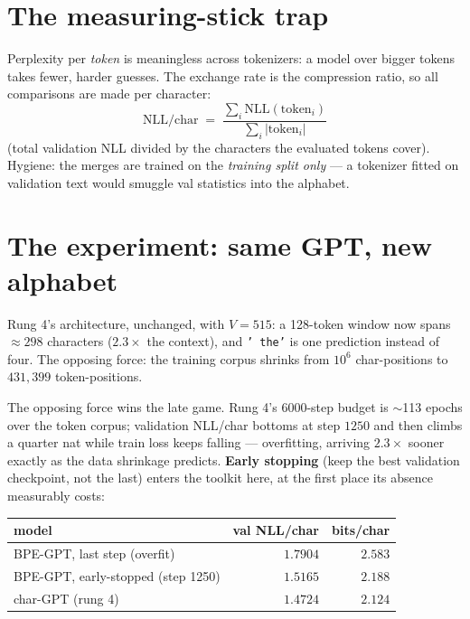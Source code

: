 \documentclass[11pt]{article}
\begin{document}
\section{The measuring-stick trap}

Perplexity per \emph{token} is meaningless across tokenizers: a model
over bigger tokens takes fewer, harder guesses. The exchange rate is
the compression ratio, so all comparisons are made per character:
\begin{equation}
  \boxed{\;\mathrm{NLL/char}
  \;=\; \frac{\sum_i \mathrm{NLL}(\mathrm{token}_i)}
             {\sum_i |\mathrm{token}_i|}\;}
  \label{eq:perchar}
\end{equation}
(total validation NLL divided by the characters the evaluated tokens
cover). Hygiene: the merges are trained on the \emph{training split
only} --- a tokenizer fitted on validation text would smuggle val
statistics into the alphabet.

\section{The experiment: same GPT, new alphabet}

Rung 4's architecture, unchanged, with $V = 515$: a 128-token window
now spans $\approx 298$ characters ($2.3\times$ the context), and
\texttt{'\ the'} is one prediction instead of four. The opposing
force: the training corpus shrinks from $10^6$ char-positions to
$431{,}399$ token-positions.

The opposing force wins the late game. Rung 4's 6000-step budget is
$\sim$113 epochs over the token corpus; validation NLL/char bottoms
at step $1250$ and then climbs a quarter nat while train loss keeps
falling --- overfitting, arriving $2.3\times$ sooner exactly as the
data shrinkage predicts. \textbf{Early stopping} (keep the best
validation checkpoint, not the last) enters the toolkit here, at the
first place its absence measurably costs:
\begin{center}
\begin{tabular}{lrr}
\toprule
model & val NLL/char & bits/char\\
\midrule
BPE-GPT, last step (overfit) & $1.7904$ & $2.583$\\
BPE-GPT, early-stopped (step 1250) & $1.5165$ & $2.188$\\
char-GPT (rung 4) & $\mathbf{1.4724}$ & $\mathbf{2.124}$\\
\bottomrule
\end{tabular}
\end{center}
\end{document}
